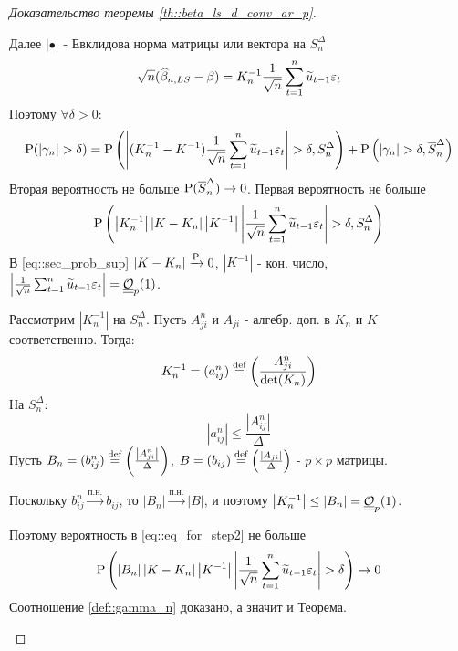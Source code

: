\begin{proof}[Доказательство теоремы \ref{th::beta_ls_d_conv_ar_p}]
\begin{enumerate}
        Далее $\left\lvert \bullet\right\rvert $ - Евклидова норма матрицы или вектора на $S_n^\Delta$
        \[\sqrt{n}(\widehat{\beta}_{n,LS}-\beta)=K^{-1}_n\frac{1}{\sqrt{n}}\sum_{t=1}^n\widetilde{u}_{t-1}\eps_t\]
        Поэтому $\forall\delta>0$:
        \[\P(\left\lvert \gamma_n\right\rvert >\delta)=\P\left(\left\lvert (K^{-1}_n-K^{-1})\frac{1}{\sqrt{n}}\sum_{t=1}^n\widetilde{u}_{t-1}\eps_t\right\rvert >\delta,S_n^\Delta\right)+\P\left(\left\lvert \gamma_n\right\rvert >\delta,\overline{S}_n^\Delta\right)\]
        Вторая вероятность не больше $\P(\overline{S}_n^\Delta)\rightarrow0$. Первая вероятность
        не больше
        \begin{equation} \label{eq::sec_prob_sup}
            \P\left(\left\lvert K_n^{-1}\right\rvert \left\lvert K-K_n\right\rvert \left\lvert K^{-1}\right\rvert \left\lvert \frac{1}{\sqrt{n}}\sum_{t=1}^n\widetilde{u}_{t-1}\eps_t\right\rvert >\delta, S_n^\Delta\right)
        \end{equation}
        В \eqref{eq::sec_prob_sup} $\left\lvert K-K_n\right\rvert \xrightarrow{\P}0$, $\left\lvert K^{-1}\right\rvert $ - кон. число, $\left\lvert \frac{1}{\sqrt{n}}\sum_{t=1}^n\widetilde{u}_{t-1}\eps_t\right\rvert =\bigO_p(1)$.

        Рассмотрим $\left\lvert K_n^{-1}\right\rvert $ на $S_n^\Delta$. Пусть $A_{ji}^n$ и $A_{ji}$ - алгебр. доп. в $K_n$ и $K$ соответственно.
        Тогда:
        \[K_n^{-1}=(a_{ij}^n)\defeq\left(\frac{A_{ji}^n}{\det(K_n)}\right)\]
        На $S_n^\Delta$:
        \[\left\lvert a^n_{ij}\right\rvert \leq\frac{\left\lvert A_{ij}^n\right\rvert }{\Delta}\]
        Пусть $B_n=(b_{ij}^n)\defeq\left(\frac{\left\lvert A_{ji}^n\right\rvert }{\Delta}\right)$, $B=(b_{ij})\defeq\left(\frac{\left\lvert A_{ji}\right\rvert }{\Delta}\right)$ - $p\times p$ матрицы.

        Поскольку $b^n_{ij}\xrightarrow{\text{п.н.}}b_{ij}$, то $\left\lvert B_n\right\rvert \xrightarrow{\text{п.н.}}\left\lvert B\right\rvert $,
        и поэтому $\left\lvert K_n^{-1}\right\rvert \leq\left\lvert B_n\right\rvert =\bigO_p(1)$.

        Поэтому вероятность в \eqref{eq::eq_for_step2} не больше
        \[\P\left(\left\lvert B_n\right\rvert \left\lvert K-K_n\right\rvert \left\lvert K^{-1}\right\rvert \left\lvert \frac{1}{\sqrt{n}}\sum_{t=1}^n\widetilde{u}_{t-1}\eps_t\right\rvert >\delta\right)\rightarrow0\]
        Соотношение \eqref{def::gamma_n} доказано, а значит и Теорема.
    \end{enumerate}
\end{proof}

